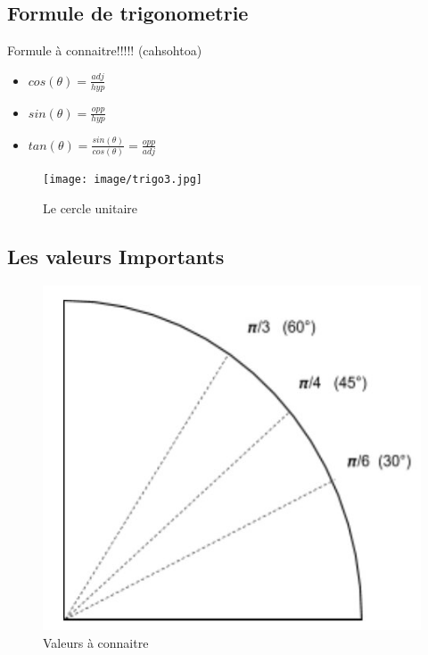 \documentclass[10pt,a4paper]{article}
\begin{document}
 \subsection{Formule de trigonometrie}
 Formule à connaitre!!!!! (cahsohtoa)\\
 \begin{itemize}
 \item  $cos(\theta)=\frac{adj}{hyp}$\\
 \item $sin(\theta)=\frac{opp}{hyp}$\\
 \item $tan(\theta)=\frac{sin(\theta)}{cos(\theta)}=\frac{opp}{adj}$
 \end{itemize}

 
 \begin{figure}[h!]
 \centering
 \texttt{[image: image/trigo3.jpg]}
 \caption{Le cercle unitaire}
 \label{fig:net}
 \end{figure}

\subsection{Les valeurs Importants}
   \begin{figure}[h!]
 \centering
 \includegraphics[scale=0.250]{image/trigo4.jpg}
 \caption{Valeurs à connaitre}
 \label{fig:net}
 \end{figure}

 
 
\end{document}
